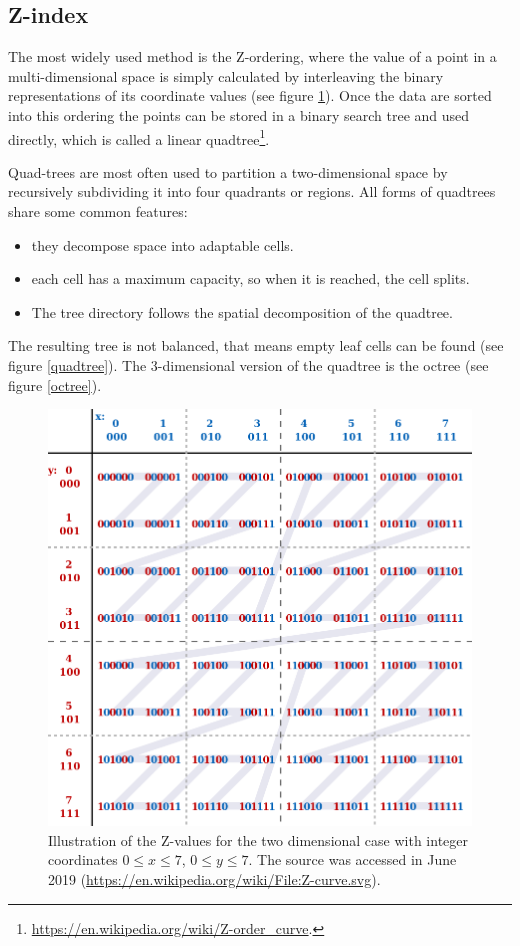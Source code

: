 \documentclass[12pt]{article}
\theoremstyle{plain}
\begin{document}
\subsection{Z-index}

The most widely used method is the Z-ordering, where the value of a point in a multi-dimensional space is simply calculated by interleaving the binary representations of its coordinate values (see figure \ref{zcurve}). Once the data are sorted into this ordering the points can be stored in a binary search tree and used directly, which is called a linear quadtree\footnote{\url{https://en.wikipedia.org/wiki/Z-order_curve}.}.

Quad-trees are most often used to partition a two-dimensional space by recursively subdividing it into four quadrants or regions. All forms of quadtrees share some common features:

\begin{itemize}
	\item they decompose space into adaptable cells.
	\item each cell has a maximum capacity, so when it is reached, the cell splits.
	\item The tree directory follows the spatial decomposition of the quadtree.
\end{itemize}

The resulting tree is not balanced, that means empty leaf cells can be found (see figure \ref{quadtree}). The 3-dimensional version of the quadtree is the octree (see figure \ref{octree}). 

\pagebreak

\begin{figure}[h!]
    \centering
	\includegraphics[width=.9\linewidth]{media/Z-curve.png}
	\caption{Illustration of the Z-values for the two dimensional case with integer coordinates $0 \leq x \leq 7$, $0 \leq y \leq 7$. The source was accessed in June 2019 (\url{https://en.wikipedia.org/wiki/File:Z-curve.svg}).}
	\label{zcurve}
\end{figure}
\newpage
\end{document}
